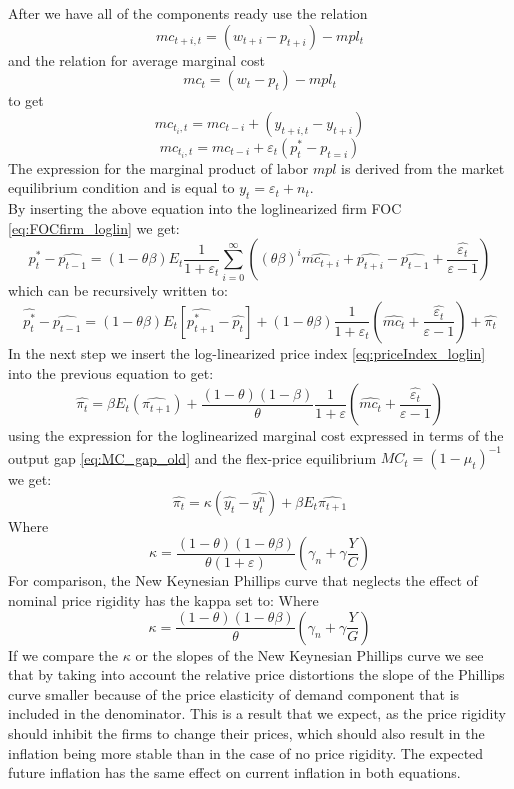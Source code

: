 \documentclass[10pt,a4paper]{article}
\begin{document}
After we have all of the components ready use the relation $$mc_{t+i,t} = (w_{t+i} - p_{t+i}) - mpl_t $$ and the relation for average marginal cost $$mc_t=(w_t-p_t) -mpl_t$$ to get 
$$mc_{t_i,t}=mc_{t-i}+(y_{t+i,t}-y_{t+i})$$
$$mc_{t_i,t}=mc_{t-i}+\varepsilon_t(p_t^*-p_{t=i})$$
The expression for the marginal product of labor $mpl$ is derived from the market equilibrium condition and is equal to $y_t=\varepsilon_t+n_t$.\\
By inserting the above equation into the loglinearized firm FOC \eqref{eq:FOCfirm_loglin} we get:
\begin{equation}
\hat{p_t^*} - \hat{p_{t-1}} 
= (1-\theta\beta) E_t \frac{1}{1+\varepsilon_t} \sum_{i=0}^{\infty} \left( (\theta\beta)^i\hat{mc_{t+i}} + \hat{p_{t+i}} - \hat{p_{t-1}} + \frac{\hat{\varepsilon_t}}{\varepsilon-1}\right)
\end{equation}
which can be recursively written to:
\begin{equation}
\hat{p_t^*} - \hat{p_{t-1}} 
= (1-\theta\beta) E_t \left[ \hat{p_{t+1}^*} - \hat{p_t} \right] +(1-\theta\beta)\frac{1}{1+\varepsilon_t}( \hat{mc_t} + \frac{\hat{\varepsilon_t}}{\varepsilon-1})+\hat{\pi_t}
\end{equation}
In the next step we insert the log-linearized price index \eqref{eq:priceIndex_loglin} into the previous equation to get:
\begin{equation}\label{eq:phillipsCurve}
\hat{\pi_t}=\beta E_t(\hat{\pi_{t+1}})+\frac{(1-\theta)(1-\beta)}{\theta}\frac{1}{1+\varepsilon}(\hat{mc_t} + \frac{\hat{\varepsilon_t}}{\varepsilon-1})
\end{equation}
using the expression for the loglinearized marginal cost expressed in terms of the output gap \eqref{eq:MC_gap_old} and the flex-price equilibrium $MC_t=(1-\mu_t)^{-1}$  we get:
\begin{equation}\label{NewKeynesian_gap}
\hat{\pi_t} =
  \kappa (\hat{y_t}-\hat{y_t^n})
+ \beta E_t\hat{\pi_{t+1}}
\end{equation}
Where
\begin{equation*}
\kappa =
\frac{(1-\theta) (1-\theta\beta)}{\theta(1+\varepsilon)} \left(\gamma_n + \gamma \frac{Y}{C} \right)
\end{equation*}
For comparison, the New Keynesian Phillips curve that neglects the effect of nominal price rigidity has the kappa set to:
Where
\begin{equation*}
\kappa = \frac{(1-\theta)(1-\theta\beta)}{\theta}\left(\gamma_n+\gamma\frac{Y}{G}\right)
\end{equation*}
If we compare the $\kappa$ or the slopes of the New Keynesian Phillips curve we see that by taking into account the relative price distortions the slope of the Phillips curve smaller because of the price elasticity of demand component that is included in the denominator. This is a result that we expect, as the price rigidity should inhibit the firms to change their prices, which should also result in the inflation being more stable than in the case of no price rigidity. The expected future inflation has the same effect on current inflation in both equations.
\end{document}
